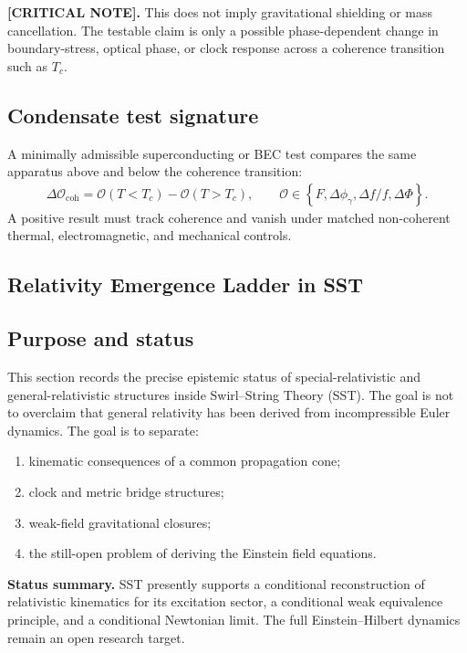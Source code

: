\textbf{[CRITICAL NOTE].}
This does not imply gravitational shielding or mass cancellation. The testable
claim is only a possible phase-dependent change in boundary-stress, optical
phase, or clock response across a coherence transition such as \(T_c\).

\subsection{Condensate test signature}

A minimally admissible superconducting or BEC test compares the same apparatus
above and below the coherence transition:
\begin{align}
    \Delta\mathcal{O}_{\mathrm{coh}}
    =
    \mathcal{O}(T<T_c)-\mathcal{O}(T>T_c),
    \qquad
    \mathcal{O}
    \in
    \left\{
    F,
    \Delta\phi_\gamma,
    \Delta f/f,
    \Delta\Phi
    \right\}.
    \label{eq:rt_condensate_test_signature}
\end{align}
A positive result must track coherence and vanish under matched non-coherent
thermal, electromagnetic, and mechanical controls.

\subsection{Relativity Emergence Ladder in SST}
\label{sec:rt_relativity_emergence_ladder}

\subsection{Purpose and status}

This section records the precise epistemic status of special-relativistic and
general-relativistic structures inside Swirl--String Theory (SST). The goal is
not to overclaim that general relativity has been derived from incompressible
Euler dynamics. The goal is to separate:
\begin{enumerate}
    \item kinematic consequences of a common propagation cone;
    \item clock and metric bridge structures;
    \item weak-field gravitational closures;
    \item the still-open problem of deriving the Einstein field equations.
\end{enumerate}

\textbf{Status summary.} SST presently supports a conditional reconstruction of
relativistic kinematics for its excitation sector, a conditional weak
equivalence principle, and a conditional Newtonian limit. The full
Einstein--Hilbert dynamics remain an open research target.

